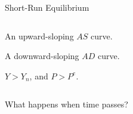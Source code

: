\documentclass[shownotes,11pt, aspectratio=169]{beamer}
\newenvironment{wideitemize}{\itemize\addtolength{\itemsep}{10pt}}{\enditemize}
\begin{document}
\begin{frame}{Short-Run Equilibrium}
\begin{columns}[T] %
\begin{column}{.44\textwidth}
  \begin{wideitemize}
    \item An upward-sloping $AS$ curve.
    \item A downward-sloping $AD$ curve.
    \item $Y > Y_n$, and $P > P^e$.
  \end{wideitemize}
\end{column}%
\pause
\hfill%
\begin{column}{.53\textwidth}
\end{column}%
\end{columns}
What happens when time passes?
\end{frame}
\end{document}
